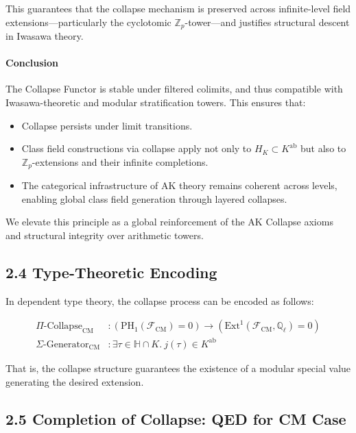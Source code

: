 \documentclass[11pt]{article}
\begin{document}
This guarantees that the collapse mechanism is preserved across infinite-level field extensions—particularly the cyclotomic \( \mathbb{Z}_p \)-tower—and justifies structural descent in Iwasawa theory.

\medskip

\paragraph{Conclusion}

The Collapse Functor is stable under filtered colimits, and thus compatible with Iwasawa-theoretic and modular stratification towers.  
This ensures that:
\begin{itemize}
  \item Collapse persists under limit transitions.
  \item Class field constructions via collapse apply not only to \( H_K \subset K^{\mathrm{ab}} \) but also to \( \mathbb{Z}_p \)-extensions and their infinite completions.
  \item The categorical infrastructure of AK theory remains coherent across levels, enabling global class field generation through layered collapses.
\end{itemize}

We elevate this principle as a global reinforcement of the AK Collapse axioms and structural integrity over arithmetic towers.


\subsection{2.4 Type-Theoretic Encoding}

In dependent type theory, the collapse process can be encoded as follows:

\begin{align*}
\Pi\text{-Collapse}_{\mathrm{CM}} &: \left(\mathrm{PH}_1(\mathcal{F}_{\mathrm{CM}}) = 0 \right) \rightarrow \left(\mathrm{Ext}^1(\mathcal{F}_{\mathrm{CM}}, \mathbb{Q}_\ell) = 0 \right) \\
\Sigma\text{-Generator}_{\mathrm{CM}} &: \exists \tau \in \mathbb{H} \cap K.\ j(\tau) \in K^{\mathrm{ab}}
\end{align*}

That is, the collapse structure guarantees the existence of a modular special value generating the desired extension.

\subsection{2.5 Completion of Collapse: QED for CM Case}
\end{document}
